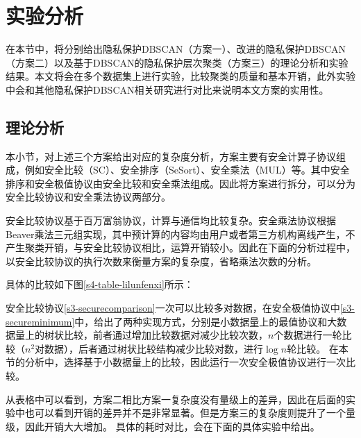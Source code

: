 \section{实验分析}
\label{s4-shiyan}
在本节中，将分别给出隐私保护DBSCAN（方案一）、改进的隐私保护DBSCAN（方案二）以及基于DBSCAN的隐私保护层次聚类（方案三）的理论分析和实验结果。本文将会在多个数据集上进行实验，比较聚类的质量和基本开销，此外实验中会和其他隐私保护DBSCAN相关研究进行对比来说明本文方案的实用性。

\subsection{理论分析}
本小节，对上述三个方案给出对应的复杂度分析，方案主要有安全计算子协议组成，例如安全比较（SC）、安全排序（SeSort）、安全乘法（MUL）等。其中安全排序和安全极值协议由安全比较和安全乘法组成。因此将方案进行拆分，可以分为安全比较协议和安全乘法协议两部分。

安全比较协议基于百万富翁协议\cite{rathee2020cryptflow2}，计算与通信均比较复杂。安全乘法协议根据Beaver乘法三元组\cite{beaver1992efficient}实现，其中预计算的内容均由用户或者第三方机构离线产生，不产生聚类开销，与安全比较协议相比，运算开销较小。因此在下面的分析过程中，以安全比较协议的执行次数来衡量方案的复杂度，省略乘法次数的分析。

具体的比较如下图\ref{s4-table-lilunfenxi}所示：

\begin{table}[htbp]
	\centering
	\renewcommand{\arraystretch}{1.3}
	\caption{方案复杂度理论分析}
	\label{s4-table-lilunfenxi}
\end{table}

安全比较协议\ref{s3-securecomparison}一次可以比较多对数据，在安全极值协议中\ref{s3-secureminimum}中，给出了两种实现方式，分别是小数据量上的最值协议和大数据量上的树状比较，前者通过增加比较数据对减少比较次数，$ n $个数据进行一轮比较（$ n^2 $对数据），后者通过树状比较结构减少比较对数，进行$ \log n $轮比较。
在本节的分析中，选择基于小数据量上的比较，因此运行一次安全极值协议进行一次比较。

从表格中可以看到，方案二相比方案一复杂度没有量级上的差异，因此在后面的实验中也可以看到开销的差异并不是非常显著。但是方案三的复杂度则提升了一个量级，因此开销大大增加。
具体的耗时对比，会在下面的具体实验中给出。
